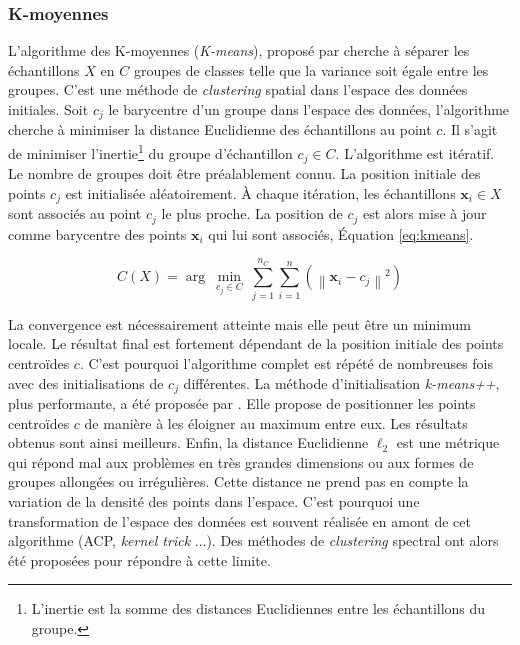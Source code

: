 \subsubsection{K-moyennes} \label{subsubsec:kmeans}
L'algorithme des K-moyennes (\textit{K-means}), proposé par \cite{macqueen_methods_1967, lloyd_least_1982} cherche à séparer les échantillons $X$ en $C$ groupes de classes telle que la variance soit égale entre les groupes.
C'est une méthode de \textit{clustering} spatial dans l'espace des données initiales.
Soit $c_j$ le barycentre d'un groupe dans l'espace des données, l'algorithme cherche à minimiser la distance Euclidienne des échantillons au point $c$.
Il s'agit de minimiser l'inertie\footnote{L'inertie est la somme des distances Euclidiennes entre les échantillons du groupe.} du groupe d'échantillon $c_j \in C$.
L'algorithme est itératif.
Le nombre de groupes doit être préalablement connu.
La position initiale des points $c_j$ est initialisée aléatoirement.
À chaque itération, les échantillons $\mathbf{x}_i \in X$ sont associés au point $c_j$ le plus proche.
La position de $c_j$ est alors mise à jour comme barycentre des points $\mathbf{x}_i$ qui lui sont associés, Équation \ref{eq:kmeans}.

\begin{equation} \label{eq:kmeans}
C(X) = \arg \ \min _{c_{j} \in C} \ \sum_{j=1}^{n_C} \sum_{i=1}^{n} \left(\left\|\mathbf{x}_{i}-c_{j}\right\|^{2}\right)
\end{equation}

La convergence est nécessairement atteinte mais elle peut être un minimum locale.
Le résultat final est fortement dépendant de la position initiale des points centroïdes $c$.
C'est pourquoi l'algorithme complet est répété de nombreuses fois avec des initialisations de $c_j$ différentes.
La méthode d'initialisation \textit{k-means++}, plus performante, a été proposée par \cite{arthur_kmeans_2007}. Elle propose de positionner les points centroïdes $c$ de manière à les éloigner au maximum entre eux. Les résultats obtenus sont ainsi meilleurs.
Enfin, la distance Euclidienne $\ell_{2}$ est une métrique qui répond mal aux problèmes en très grandes dimensions ou aux formes de groupes allongées ou irrégulières.
Cette distance ne prend pas en compte la variation de la densité des points dans l'espace.
C'est pourquoi une transformation de l'espace des données est souvent réalisée en amont de cet algorithme (ACP, \textit{kernel trick} ...).
Des méthodes de \textit{clustering} spectral ont alors été proposées pour répondre à cette limite.

